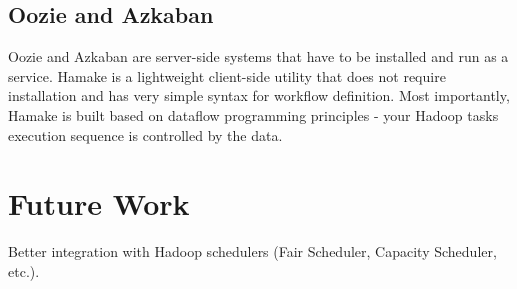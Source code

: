 \documentclass{article}
\begin{document}
\subsection{Oozie and Azkaban}

Oozie and Azkaban are server-side systems that have to be installed
and run as a service. Hamake is a lightweight client-side utility that
does not require installation and has very simple syntax for workflow
definition.  Most importantly, Hamake is built based on dataflow
programming principles - your Hadoop tasks execution sequence is
controlled by the data.
 

\section{Future Work}

Better integration with Hadoop schedulers (Fair Scheduler, Capacity
Scheduler, etc.).

\nocite{*}


\end{document}
